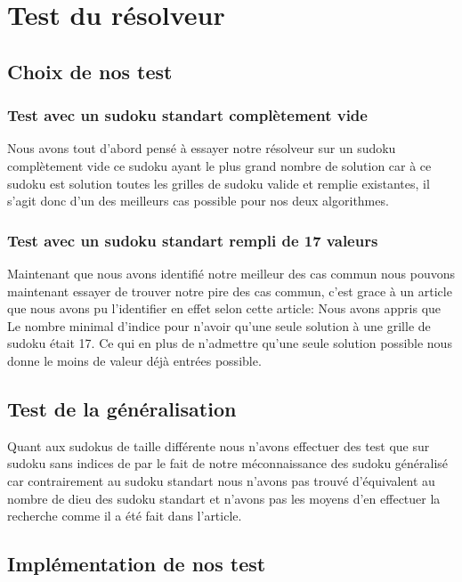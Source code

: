 \section{Test du résolveur}

\subsection{Choix de nos test}

\subsubsection{Test avec un sudoku standart complètement vide}

Nous avons tout d'abord pensé à essayer notre résolveur sur un sudoku complètement vide ce sudoku ayant le plus grand nombre de solution car à ce sudoku est solution toutes les grilles de sudoku valide et remplie existantes, il s'agit donc d'un des meilleurs cas possible pour nos deux algorithmes.

\subsubsection{Test avec un sudoku standart rempli de 17 valeurs}

Maintenant que nous avons identifié notre meilleur des cas commun nous pouvons maintenant essayer de trouver notre pire des cas commun, c'est grace à un article que nous avons pu l'identifier en effet selon cette article: \cite{NombredeDieu}\newline
Nous avons appris que Le nombre minimal d'indice pour n'avoir qu'une seule solution à une grille de sudoku était 17. Ce qui en plus de n'admettre qu'une seule solution possible nous donne le moins de valeur déjà entrées possible.

\subsection{Test de la généralisation}

Quant aux sudokus de taille différente nous n'avons effectuer des test que sur sudoku sans indices de par le fait de notre méconnaissance des sudoku généralisé car contrairement au sudoku standart nous n'avons pas trouvé d'équivalent au nombre de dieu des sudoku standart et n'avons pas les moyens d'en effectuer la recherche comme il a été fait dans l'article.

\subsection{Implémentation de nos test}

